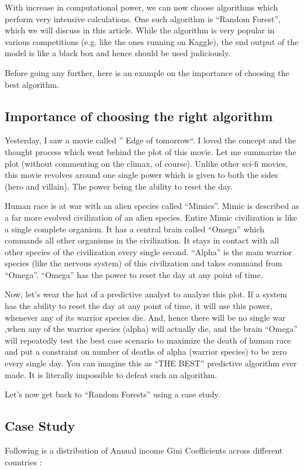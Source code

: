\documentclass[a4paper,12pt]{article}
\begin{document}
With increase in computational power, we can now choose algorithms which perform very intensive calculations. One such algorithm is “Random Forest”, which we will discuss in this article. While the algorithm is very popular in various competitions (e.g. like the ones running on Kaggle), the end output of the model is like a black box and hence should be used judiciously.

Before going any further, here is an example on the importance of choosing the best algorithm.



\subsection*{Importance of choosing the right algorithm}
Yesterday, I saw a movie called ” Edge of tomorrow“.  I loved the concept and the thought process which went behind the plot of this movie. Let me summarize the plot (without commenting on the climax, of course). Unlike other sci-fi movies, this movie revolves around one single power which is given to both the sides (hero and villain). The power being the ability to reset the day.

Human race is at war with an alien species called “Mimics”.  Mimic is described as a far more evolved civilization of an alien species. Entire Mimic civilization is like a single complete organism. It has a central brain called “Omega” which commands all other organisms in the civilization. It stays in contact with all other species of the civilization every single second. “Alpha” is the main warrior species (like the nervous system) of this civilization and takes command from “Omega”. “Omega” has the power to reset the day at any point of time.

Now, let’s wear the hat of a predictive analyst to analyze this plot. If a system has the ability to reset the day at any point of time, it will use this power, whenever any of its warrior species die. And, hence there will be no single war ,when any of the warrior species (alpha) will actually die, and the brain “Omega” will repeatedly test the best case scenario to maximize the death of human race and put a constraint on number of deaths of alpha (warrior species) to be zero every single day. You can imagine this as “THE BEST” predictive algorithm ever made. It is literally impossible to defeat such an algorithm.

Let’s now get back to “Random Forests” using a case study.


\subsection*{Case Study}
Following is a distribution of Annual income Gini Coefficients across different countries :
\end{document}
